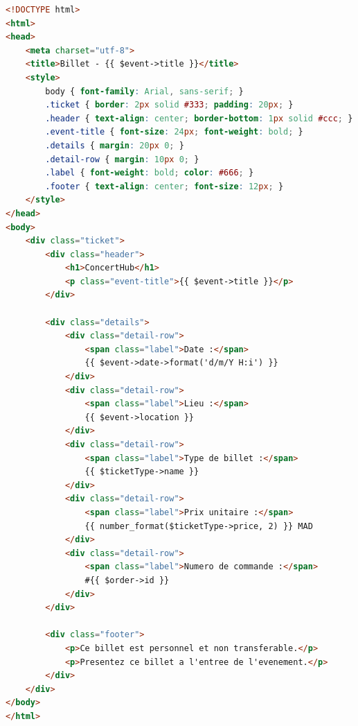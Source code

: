 \documentclass[a4paper,12pt,twoside]{report}
\begin{document}
\begin{lstlisting}[language=HTML,caption=resources/views/tickets/pdf.blade.php]
<!DOCTYPE html>
<html>
<head>
    <meta charset="utf-8">
    <title>Billet - {{ $event->title }}</title>
    <style>
        body { font-family: Arial, sans-serif; }
        .ticket { border: 2px solid #333; padding: 20px; }
        .header { text-align: center; border-bottom: 1px solid #ccc; }
        .event-title { font-size: 24px; font-weight: bold; }
        .details { margin: 20px 0; }
        .detail-row { margin: 10px 0; }
        .label { font-weight: bold; color: #666; }
        .footer { text-align: center; font-size: 12px; }
    </style>
</head>
<body>
    <div class="ticket">
        <div class="header">
            <h1>ConcertHub</h1>
            <p class="event-title">{{ $event->title }}</p>
        </div>
        
        <div class="details">
            <div class="detail-row">
                <span class="label">Date :</span>
                {{ $event->date->format('d/m/Y H:i') }}
            </div>
            <div class="detail-row">
                <span class="label">Lieu :</span>
                {{ $event->location }}
            </div>
            <div class="detail-row">
                <span class="label">Type de billet :</span>
                {{ $ticketType->name }}
            </div>
            <div class="detail-row">
                <span class="label">Prix unitaire :</span>
                {{ number_format($ticketType->price, 2) }} MAD
            </div>
            <div class="detail-row">
                <span class="label">Numero de commande :</span>
                #{{ $order->id }}
            </div>
        </div>
        
        <div class="footer">
            <p>Ce billet est personnel et non transferable.</p>
            <p>Presentez ce billet a l'entree de l'evenement.</p>
        </div>
    </div>
</body>
</html>
\end{lstlisting}

\printindex
\end{document}

